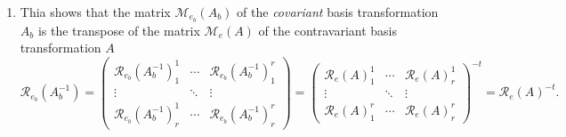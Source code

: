 \documentclass[aps,preprint]{revtex4}
\begin{document}
\begin{enumerate}
\begin{enumerate}
\item Thia shows that the matrix $\mathcal{M}_{e_{b}}\left( A_{b}\right) $
of the \emph{covariant} basis transformation $A_{b}$ is the transpose of the
matrix $\mathcal{M}_{e}\left( A\right) $ of the contravariant basis
transformation $A$ 
\begin{equation}
\mathcal{R}_{e_{b}}\left( A_{b}^{-1}\right) =\left( 
\begin{array}{ccc}
\mathcal{R}_{e_{b}}\left( A_{b}^{-1}\right) _{1}^{1} & \cdots & \mathcal{R}%
_{e_{b}}\left( A_{b}^{-1}\right) _{1}^{r} \\ 
\vdots & \ddots & \vdots \\ 
\mathcal{R}_{e_{b}}\left( A_{b}^{-1}\right) _{r}^{1} & \cdots & \mathcal{R}%
_{e_{b}}\left( A_{b}^{-1}\right) _{r}^{r}%
\end{array}%
\right) =\left( 
\begin{array}{ccc}
\mathcal{R}_{e}\left( A\right) _{1}^{1} & \cdots & \mathcal{R}_{e}\left(
A\right) _{r}^{1} \\ 
\vdots & \ddots & \vdots \\ 
\mathcal{R}_{e}\left( A\right) _{1}^{r} & \cdots & \mathcal{R}_{e}\left(
A\right) _{r}^{r}%
\end{array}%
\right) ^{-t}=\mathcal{R}_{e}\left( A\right) ^{-t}.
\end{equation}
\end{enumerate}


\end{enumerate}
\end{document}
